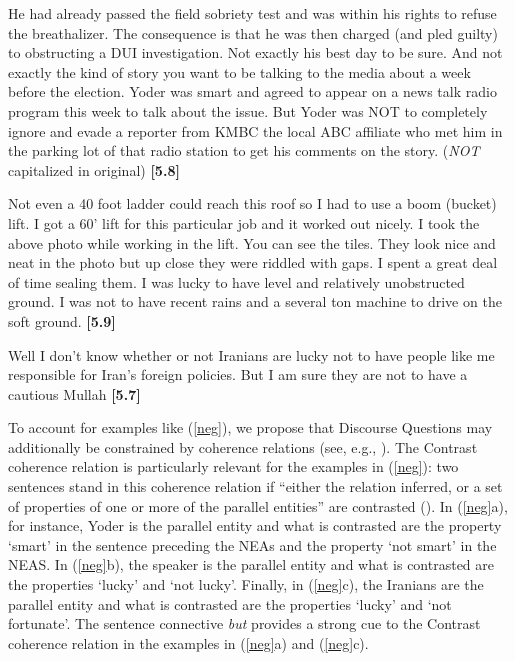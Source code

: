 \documentclass[11pt,fleqn]{article}
\newcommand{\6}{\mbox{$[\hspace*{-.6mm}[$}}
\newcommand{\9}{\mbox{$]\hspace*{-.6mm}]$}}
\begin{document}
\begin{exe} 
\ex\label{neg}

\begin{xlist}

\ex He had already passed the field sobriety test and was within his
rights to refuse the breathalizer. The consequence is that he was then
charged (and pled guilty) to obstructing a DUI investigation. Not
exactly his best day  to be sure. And not exactly the kind of story you
want to be talking to the media about a week before the election. Yoder
was smart and agreed to appear on a news talk radio program this week
to talk about the issue. But Yoder was NOT  to completely
ignore and evade a reporter from KMBC  the local ABC affiliate  who met
him in the parking lot of that radio station to get his comments on the
story. \hfill ({\em NOT} capitalized in original) {\bf [5.8]}

\ex Not even a 40 foot ladder could reach this roof  so I had to use a
boom (bucket) lift. I got a 60' lift for this particular job  and it
worked out nicely. I took the above photo while working in the lift. You
can see the tiles. They look nice and neat in the photo  but up close 
they were riddled with gaps. I spent a great deal of time sealing them.
I was lucky to have level and relatively unobstructed ground. I was not
 to have recent rains and a several ton machine to drive on
the soft ground. \hfill {\bf [5.9]}

\ex Well I don't know whether or not Iranians are lucky not to have
people like me responsible for Iran's foreign policies. But I am sure
they are not  to have a cautious Mullah \hfill {\bf
[5.7]}

\end{xlist}

\end{exe}

To account for examples like (\ref{neg}), we propose that Discourse Questions may additionally be constrained by coherence relations (see, e.g., \citealt{hobbs1985,mann-thompson1988,asher-lascarides2003,kehler2004}). The Contrast coherence relation  is particularly relevant for the examples in (\ref{neg}):  two sentences stand in this coherence relation if ``either the relation inferred, or a set of properties of one or more of the parallel entities'' are contrasted (\citealt[432]{kehler00}). In (\ref{neg}a), for instance, Yoder is the parallel entity and what is contrasted are the property `smart' in the sentence preceding the NEAs and the property `not smart' in the NEAS. In (\ref{neg}b), the speaker is the parallel entity and what is contrasted are the properties `lucky' and `not lucky'. Finally, in (\ref{neg}c), the Iranians are the parallel entity and what is contrasted are the properties `lucky' and `not fortunate'. The sentence connective {\em but} provides a strong cue to the Contrast coherence relation in the examples in (\ref{neg}a) and (\ref{neg}c).  
\end{document}
